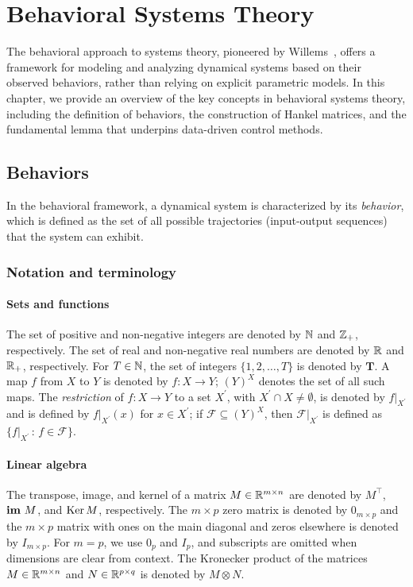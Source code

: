 \chapter{Behavioral Systems Theory}\label{ch:Behaviors}

The behavioral approach to systems theory, pioneered by Willems~\cite{willems2007}, offers a framework for modeling and analyzing dynamical systems based on their observed behaviors, rather than relying on explicit parametric models. In this chapter, we provide an overview of the key concepts in behavioral systems theory, including the definition of behaviors, the construction of Hankel matrices, and the fundamental lemma that underpins data-driven control methods.

\section{Behaviors}
In the behavioral framework, a dynamical system is characterized by its \emph{behavior}, which is defined as the set of all possible trajectories (input-output sequences) that the system can exhibit.

\subsection{Notation and terminology}

\subsubsection{Sets and functions}
The set of positive and non-negative integers are denoted by $\mathbb{N}$ and $\mathbb{Z}_+$, respectively. The set of real and non-negative real numbers are denoted by $\mathbb{R}$ and $\mathbb{R}_+$, respectively.  
For ${T\in\mathbb{N}}$, the set of integers $\{1, 2, \dots , T\}$ is denoted by $\mathbf{T}$.  A map $f$ from $X$ to $Y$ is denoted by ${f:X \to Y}$; $(Y)^{X}$ denotes the set of all such maps. The \textit{restriction} of ${f:X \to Y}$ to a set ${X^{\prime}}$, with ${X^{\prime} \cap X \neq \emptyset}$, is denoted by $f|_{X^{\prime}}$ and is defined by $f|_{X^{\prime}}(x)$ for ${x \in X^{\prime}}$; if ${\mathcal{F} \subseteq (Y)^{X}}$, then $\mathcal{F}|_{X^{\prime}}$ is defined as ${\{ f|_{X^{\prime}} \, : \, f \in \mathcal{F}\}}$.

\subsubsection{Linear algebra}
The transpose, image, and kernel of a matrix ${M\in\mathbb{R}^{m\times n}}$ are denoted by $M^{\top}$, $\mathbf{im} \,\, M$, and $\operatorname{Ker} M$, respectively. The $m \times p$ zero matrix is denoted by $0_{m \times p}$ and the $m \times p$ matrix with ones on the main diagonal and zeros elsewhere is denoted by $I_{m \times p}$. For $m = p$, we use $0_p$ and $I_p$, and subscripts are omitted when dimensions are clear from context. The Kronecker product of the matrices $M \in \mathbb{R}^{m \times n}$ and $N \in \mathbb{R}^{p \times q}$ is denoted by $M \otimes N$. 


